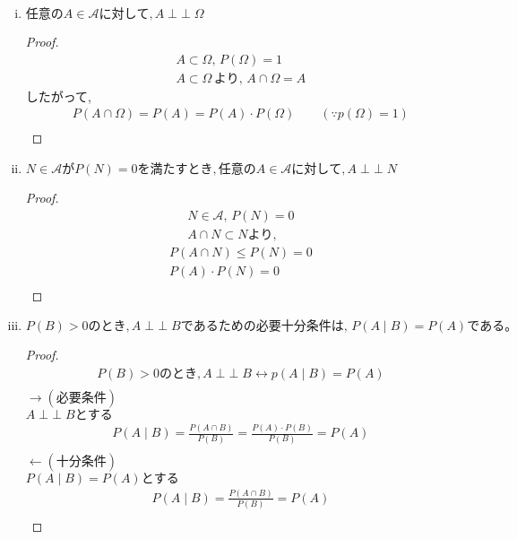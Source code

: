 \documentclass[dvipdfmx,10pt, a4j]{jarticle}
\newcommand{\indepe}{\mathop{\perp\!\!\!\perp}}
\theoremstyle{definition}
\begin{document}
\begin{enumerate}[i)]
        \newpage
        \item $任意の A \in \mathcal{A} に対して, A \indepe \Omega$
        \begin{proof}
            \begin{align*}
                A \subset \Omega, \, P(\Omega) = 1\\
                A \subset \Omega \, より, \, A \cap \Omega = A
            \end{align*}
            したがって,\\
            \begin{align*}
                P(A \cap \Omega) = P(A) = P(A) \cdot P(\Omega) \qquad (\because p(\Omega) = 1)\\
            \end{align*}
        \end{proof}
        \item $N \in \mathcal{A} が P(N) = 0 を満たすとき, 任意のA \in \mathcal{A} に対して, A \indepe N$
        \begin{proof}
            \begin{align*}
                N \in \mathcal{A}, \, P(N) = 0\\
                A \cap N \subset N より,
            \end{align*}
            \begin{align*}
                P(A \cap N) \leq P(N) = 0\\
                P(A) \cdot P(N) = 0\\
            \end{align*}
        \end{proof}
        \item $P(B) > 0のとき, A \indepe Bであるための必要十分条件は, \, P(A \mid B) = P(A) である。$
        \begin{proof}
            \begin{align*}
                P(B) > 0のとき, A \indepe B \leftrightarrow p(A \mid B) = P(A)\\
            \end{align*}
            $\rightarrow (必要条件)$\\
            $A \indepe B とする$
            \begin{align*}
                P(A \mid B) = \frac{P(A \cap B)}{P(B)} = \frac{P(A) \cdot P(B)}{P(B)} = P(A)\\
            \end{align*}
            $\leftarrow (十分条件)$\\
            $P(A \mid B) = P(A) とする$
            \begin{align*}
                P(A \mid B) = \frac{P(A \cap B)}{P(B)} = P(A)\\
            \end{align*}
        \end{proof}
    \end{enumerate}
\end{document}
